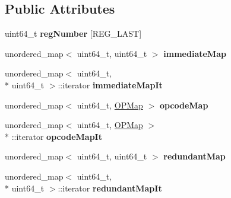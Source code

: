 \subsection*{Public Attributes}
\begin{DoxyCompactItemize}
\item 
\hypertarget{classThreadData__t_a08574b1d9c8759a4716431494148452f}{uint64\-\_\-t {\bfseries reg\-Number} \mbox{[}R\-E\-G\-\_\-\-L\-A\-S\-T\mbox{]}}\label{classThreadData__t_a08574b1d9c8759a4716431494148452f}

\item 
\hypertarget{classThreadData__t_ae9572c498b01ee8fb45a9c214c3ea38d}{unordered\-\_\-map$<$ uint64\-\_\-t, uint64\-\_\-t $>$ {\bfseries immediate\-Map}}\label{classThreadData__t_ae9572c498b01ee8fb45a9c214c3ea38d}

\item 
\hypertarget{classThreadData__t_a4f7f7ded925b7e4ff905215d216d6e7e}{unordered\-\_\-map$<$ uint64\-\_\-t, \\*
uint64\-\_\-t $>$\-::iterator {\bfseries immediate\-Map\-It}}\label{classThreadData__t_a4f7f7ded925b7e4ff905215d216d6e7e}

\item 
\hypertarget{classThreadData__t_a4bcf08d6b95afe71c3a26830a71f9c67}{unordered\-\_\-map$<$ uint64\-\_\-t, \hyperlink{structopMap}{O\-P\-Map} $>$ {\bfseries opcode\-Map}}\label{classThreadData__t_a4bcf08d6b95afe71c3a26830a71f9c67}

\item 
\hypertarget{classThreadData__t_a4d3247c71db09c581be7f97fef207157}{unordered\-\_\-map$<$ uint64\-\_\-t, \hyperlink{structopMap}{O\-P\-Map} $>$\\*
\-::iterator {\bfseries opcode\-Map\-It}}\label{classThreadData__t_a4d3247c71db09c581be7f97fef207157}

\item 
\hypertarget{classThreadData__t_a9a19ba920cd1a058d42ebd0e5a662d4f}{unordered\-\_\-map$<$ uint64\-\_\-t, uint64\-\_\-t $>$ {\bfseries redundant\-Map}}\label{classThreadData__t_a9a19ba920cd1a058d42ebd0e5a662d4f}

\item 
\hypertarget{classThreadData__t_a33b51bf837061adf532cc348db222b87}{unordered\-\_\-map$<$ uint64\-\_\-t, \\*
uint64\-\_\-t $>$\-::iterator {\bfseries redundant\-Map\-It}}\label{classThreadData__t_a33b51bf837061adf532cc348db222b87}

\end{DoxyCompactItemize}
